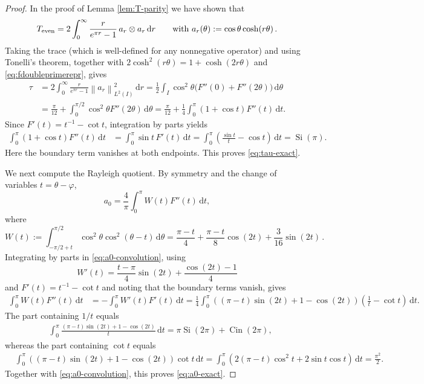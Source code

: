 \documentclass[11pt]{article}
\theoremstyle{definition}
\theoremstyle{remark}
\newcommand{\norm}[1]{\left\lVert #1\right\rVert}
\newcommand{\dd}{\,\mathrm{d}}
\begin{document}
\begin{proof}
In the proof of Lemma \ref{lem:T-parity} we have shown that
\begin{equation}%
T_{\rm even}
=2\int_0^\infty\frac{r}{e^{\pi r}-1}
\,a_r\otimes a_r\dd r
\qquad\text{with}\
a_r(\theta):=\cos\theta\cosh(r\theta) \,.
\end{equation}
Taking the trace (which is well-defined for any nonnegative operator) and using Tonelli's
theorem, together with
$2\cosh^2(r\theta)=1+\cosh(2r\theta)$ and
\eqref{eq:fdoubleprimerepr}, gives
\begin{align*}
\tau
&=2\int_0^\infty\frac{r}{e^{\pi r}-1}\norm{a_r}_{L^2(I)}^2\dd r
=\frac12\int_I\cos^2\theta
\bigl(F''(0)+F''(2\theta)\bigr)\dd\theta \\
& =\frac{\pi}{12}
+\int_0^{\pi/2}\cos^2\theta F''(2\theta)\dd\theta 
=\frac{\pi}{12}
+\frac14\int_0^\pi(1+\cos t)F''(t)\dd t.
\end{align*}
Since $F'(t)=t^{-1}-\cot t$, integration by parts yields
\begin{align*}
\int_0^\pi(1+\cos t)F''(t)\dd t
&=\int_0^\pi\sin t\,F'(t)\dd t
=\int_0^\pi\left(\frac{\sin t}{t}-\cos t\right)\dd t
=\operatorname{Si}(\pi).
\end{align*}
Here the boundary term vanishes at both endpoints.  This proves
\eqref{eq:tau-exact}.

We next compute the Rayleigh quotient.  By symmetry and the change of
variables $t=\theta-\varphi$,
\begin{equation}\label{eq:a0-convolution}
a_0=\frac4\pi\int_0^\pi W(t)F''(t)\dd t,
\end{equation}
where
\[
W(t):=\int_{-\pi/2+t}^{\pi/2}
\cos^2\theta\cos^2(\theta-t)\dd\theta =\frac{\pi-t}{4}
+\frac{\pi-t}{8}\cos(2t)+\frac{3}{16}\sin(2t) \,.
\]
Integrating by parts in \eqref{eq:a0-convolution}, using
\begin{equation}\label{eq:W-prime}
W'(t)=\frac{t-\pi}{4}\sin(2t)
+\frac{\cos(2t)-1}{4}
\end{equation}
and $F'(t)=t^{-1}-\cot t$ and noting that the boundary terms vanish, gives
\begin{align*}
\int_0^\pi W(t)F''(t)\dd t
&=-\int_0^\pi W'(t)F'(t)\dd t
=\frac14\int_0^\pi
\left((\pi-t)\sin(2t)+1-\cos(2t)\right)
\left(\frac1t-\cot t\right)\dd t.
\end{align*}
The part containing $1/t$ equals
\begin{align*}
&\int_0^\pi
\frac{(\pi-t)\sin(2t)+1-\cos(2t)}{t}\dd t =\pi\operatorname{Si}(2\pi)
+\operatorname{Cin}(2\pi),
\end{align*}
whereas the part containing $\cot t$ equals
\begin{align*}
&\int_0^\pi
\left((\pi-t)\sin(2t)+1-\cos(2t)\right)\cot t\dd t
=\int_0^\pi
\left(2(\pi-t)\cos^2t+2\sin t\cos t\right)\dd t
=\frac{\pi^2}{2}.
\end{align*}
Together with \eqref{eq:a0-convolution}, this proves
\eqref{eq:a0-exact}.


\end{proof}
\end{document}
